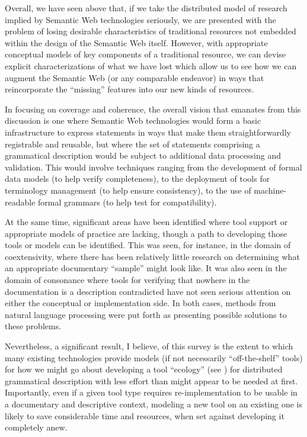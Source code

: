 \documentclass[12pt]{article}
\newcommand\namecite{\citet}
\begin{document}
Overall, we have seen above that, if we take the distributed model of research
implied by Semantic Web technologies seriously, we are presented with the
problem of losing desirable characteristics of traditional resources not
embedded within the design of the Semantic Web itself. However, with appropriate
conceptual models of key components of a traditional resource, we can devise
explicit characterizations of what we have lost which allow us to see how we can
augment the Semantic Web (or any comparable endeavor) in ways that reincorporate
the ``missing'' features into our new kinds of resources.

In focusing on coverage and coherence, the overall vision that emanates from
this discussion is one where Semantic Web technologies would form a basic
infrastructure to express statements in ways that make them straightforwardly
registrable and reusable, but where the set of statements comprising a
grammatical description would be subject to additional data processing and
validation. This would involve techniques ranging from the development of formal
data models (to help verify completeness), to the deployment of tools for
terminology management (to help ensure consistency), to the use of
machine-readable formal grammars (to help test for compatibility).

At the same time, significant areas have been identified where tool support or
appropriate models of practice are lacking, though a path to developing those
tools or models can be identified. This was seen, for instance, in the domain of
coextensivity, where there has been relatively little research on determining
what an appropriate documentary ``sample'' might look like. It was also seen in
the domain of consonance where tools for verifying that nowhere in the
documentation is a description contradicted have not seen serious attention on
either the conceptual or implementation side. In both cases, methods from
natural language processing were put forth as presenting possible solutions to
these problems.

Nevertheless, a significant result, I believe, of this survey is the extent to
which many existing technologies provide models (if not necessarily
``off-the-shelf'' tools) for how we might go about developing a tool ``ecology''
(see \namecite{Good:ToolEcology}) for distributed grammatical description with
less effort than might appear to be needed at first. Importantly, even if a
given tool type requires re-implementation to be usable in a documentary and
descriptive context, modeling a new tool on an existing one is likely to save
considerable time and resources, when set against developing it completely anew.
\end{document}
